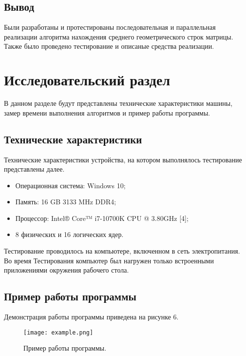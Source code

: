 \subsection{Вывод}

Были разработаны и протестированы последовательная и параллельная реализации алгоритма нахождения среднего геометрического строк матрицы. Также было проведено тестирование и описаные средства реализации.

\section{Исследовательский раздел}

В данном разделе будут представлены технические характеристики машины, замер времени выполнения алгоритмов и пример работы программы.

\subsection{Технические характеристики}

Технические характеристики устройства, на котором выполнялось тестирование представлены далее.

\begin{itemize}
    \item Операционная система: Windows 10;
    \item Память: 16 GB 3133 MHz DDR4;
    \item Процессор: Intel® Core™ i7-10700K CPU @ 3.80GHz [4];
    \item 8 физических и 16 логических ядер.
\end{itemize}

Тестирование проводилось на компьютере, включенном в сеть электропитания.
Во время Тестирования компьютер был нагружен только встроенными приложениями окружения рабочего стола.

\subsection{Пример работы программы}

Демонстрация работы программы приведена на рисунке 6.
\vspace{5mm}

\begin{figure}[h]
	\begin{center}
	\texttt{[image: example.png]}
	 \caption{Пример работы программы.}
	\end{center}
\end{figure}

